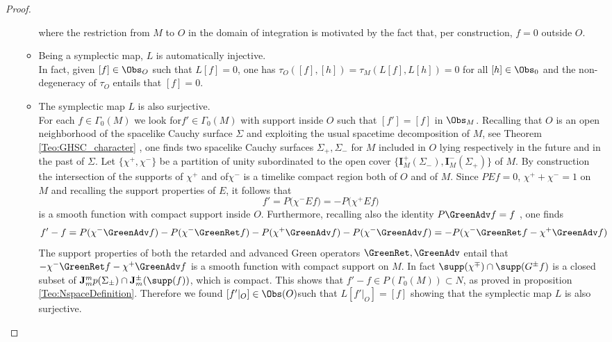 \documentclass[Main]{subfiles}
\begin{document}
\begin{proof}
\begin{itemize}
\begin{itemize}
									where the restriction from $M$ to $O$ in the domain of integration is motivated by the fact that, per construction, $f = 0$ outside $O$.
								\item Being a symplectic map, $L$ is automatically injective. \\
									In fact, given $[ f ] \in \Obs_O$ such that $L[ f ] = 0$, one has $\tau_O([ f ], [h]) = \tau_M(L[ f ],L[h]) = 0$ for all $[h] \in \Obs_0$ and the non-degeneracy of $\tau_O$ entails that $[ f ] = 0$.
								\item The symplectic map $L$ is also surjective.\\
									For each $f\in \Gamma_0(M)$ we look for$ f' \in \Gamma_0(M)$ with support inside $O$ such that $[f']=[f]$ in $\Obs_M$.
									Recalling that $O$ is an open neighborhood of the spacelike Cauchy surface $\Sigma$ and exploiting the usual spacetime decomposition of $M$, see Theorem \ref{Teo:GHSC_character} , one finds two spacelike Cauchy surfaces $\Sigma_+,\Sigma_-$ for $M$ included in $O$ lying respectively in the future and in the past of $\Sigma$. Let $\{\chi^+,\chi^-\}$ be a partition of unity subordinated to the open cover $\{\mathbf{I}^+_M(\Sigma_-), \mathbf{I}^-_M(\Sigma_+)\}$ of $M$. 
									By construction the intersection of the supports of $\chi^+$ and of$\chi^-$ is a timelike compact region both of $O$ and of $M$. 
									Since $PE f = 0$, $\chi^+ +\chi^-=1$ on $M$ and recalling the support properties of $E$, it follows that 
									\begin{displaymath}
									f' = P\big( \chi^- E f \big) =  - P \big( \chi^+ E f \big)
									\end{displaymath}
									is a smooth function with compact support inside $O$. 
									Furthermore, recalling also the identity $P \GreenAdv f = f$ , one finds
									\begin{displaymath}
									f' -f = P(\chi^- \GreenAdv f) - P ( \chi^- \GreenRet f ) - P ( \chi^+ \GreenAdv f) - P(\chi^- \GreenAdv f) = - P(\chi^- \GreenRet f - \chi^+ \GreenAdv f )
									\end{displaymath}
									The support properties of both the retarded and advanced Green operators $\GreenRet, \GreenAdv$ entail that $-\chi^-\GreenRet f - \chi^+ \GreenAdv f$ is a smooth function with compact support on $M$. In fact $\supp(\chi^\mp) \cap \supp(G^\pm f )$ is a closed subset of $\mathbf{J}_m^mp(\Sigma_\pm) \cap \mathbf{J}_m^\pm(\supp(f))$, which is compact.
									This shows that $f' -f \in P(\Gamma_0(M)) \subset N$, as proved in proposition \ref{Teo:NspaceDefinition}. 
									Therefore we found $[ f'\vert_O] \in \Obs(O)$such that $L[ f'\vert_O]=[ f ]$ showing that the symplectic map $L$ is also surjective.
						\end{itemize}
					\end{itemize}		
				\end{proof}
			
\end{document}
